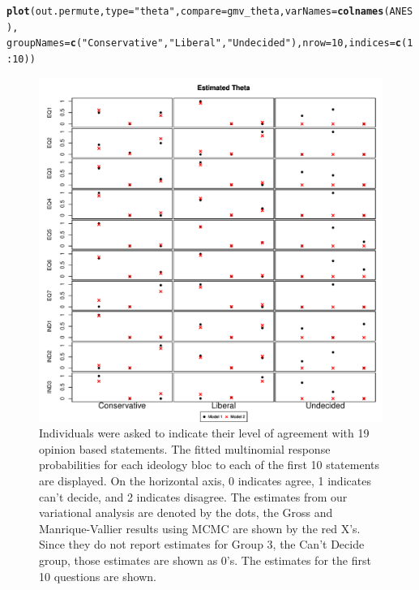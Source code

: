 \documentclass{article}\usepackage[]{graphicx}\usepackage[]{color}
\makeatletter
\def\maxwidth{ %
  \ifdim\Gin@nat@width>\linewidth
    \linewidth
  \else
    \Gin@nat@width
  \fi
}
\newcommand{\hlnum}[1]{\textcolor[rgb]{0.686,0.059,0.569}{#1}}%
\newcommand{\hlstr}[1]{\textcolor[rgb]{0.192,0.494,0.8}{#1}}%
\newcommand{\hlopt}[1]{\textcolor[rgb]{0,0,0}{#1}}%
\newcommand{\hlstd}[1]{\textcolor[rgb]{0.345,0.345,0.345}{#1}}%
\newcommand{\hlkwc}[1]{\textcolor[rgb]{0.333,0.667,0.333}{#1}}%
\newcommand{\hlkwd}[1]{\textcolor[rgb]{0.737,0.353,0.396}{\textbf{#1}}}%
\newenvironment{kframe}{%
 \def\at@end@of@kframe{}%
 \ifinner\ifhmode%
  \def\at@end@of@kframe{\end{minipage}}%
  \begin{minipage}{\columnwidth}%
 \fi\fi%
 \def\FrameCommand##1{\hskip\@totalleftmargin \hskip-\fboxsep
 \colorbox{shadecolor}{##1}\hskip-\fboxsep
     \hskip-\linewidth \hskip-\@totalleftmargin \hskip\columnwidth}%
 \MakeFramed {\advance\hsize-\width
   \@totalleftmargin\z@ \linewidth\hsize
   \@setminipage}}%
 {\par\unskip\endMakeFramed%
 \at@end@of@kframe}
\newenvironment{knitrout}{}{} %
\renewenvironment{knitrout}{\begin{singlespace}}{\end{singlespace}}
\makeatother
\begin{document}
\begin{knitrout}
\color{fgcolor}\begin{kframe}
\begin{alltt}
\hlkwd{plot}\hlstd{(out.permute,} \hlkwc{type} \hlstd{=} \hlstr{"theta"}\hlstd{,} \hlkwc{compare} \hlstd{= gmv_theta,} \hlkwc{varNames} \hlstd{=} \hlkwd{colnames}\hlstd{(ANES),}
         \hlkwc{groupNames} \hlstd{=} \hlkwd{c}\hlstd{(}\hlstr{"Conservative"}\hlstd{,} \hlstr{"Liberal"}\hlstd{,} \hlstr{"Undecided"}\hlstd{),} \hlkwc{nrow} \hlstd{=} \hlnum{10}\hlstd{,} \hlkwc{indices} \hlstd{=} \hlkwd{c}\hlstd{(}\hlnum{1}\hlopt{:}\hlnum{10}\hlstd{))}
\end{alltt}
\end{kframe}\begin{figure}

{\centering \includegraphics[width=\maxwidth]{figure/theta-1} 

}

\caption[Individuals were asked to indicate their level of agreement with 19 opinion based statements]{Individuals were asked to indicate their level of agreement with 19 opinion based statements. The fitted multinomial response probabilities for each ideology bloc to each of the first 10 statements are displayed. On the horizontal axis, 0 indicates agree, 1 indicates can't decide, and 2 indicates disagree. The estimates from our variational analysis are denoted by the dots, the Gross and Manrique-Vallier results using MCMC are shown by the red X's. Since they do not report estimates for Group 3, the Can't Decide group, those estimates are shown as 0's. The estimates for the first 10 questions are shown.}\label{fig:theta}
\end{figure}


\end{knitrout}
\end{document}
